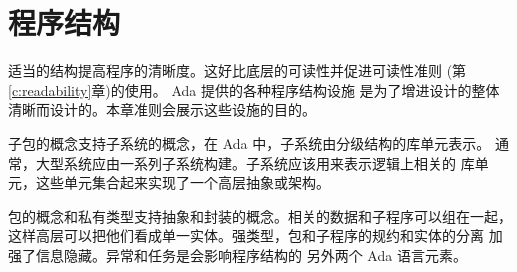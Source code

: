 %
%
%

\chapter{程序结构}

适当的结构提高程序的清晰度。这好比底层的可读性并促进可读性准则
 (第\ref{c:readability}章)的使用。 Ada 提供的各种程序结构设施
是为了增进设计的整体清晰而设计的。本章准则会展示这些设施的目的。

子包的概念支持子系统的概念，在 Ada 中，子系统由分级结构的库单元表示。
通常，大型系统应由一系列子系统构建。子系统应该用来表示逻辑上相关的
库单元，这些单元集合起来实现了一个高层抽象或架构。

包的概念和私有类型支持抽象和封装的概念。相关的数据和子程序可以组在一起，
这样高层可以把他们看成单一实体。强类型，包和子程序的规约和实体的分离
加强了信息隐藏。异常和任务是会影响程序结构的 另外两个 Ada 语言元素。




